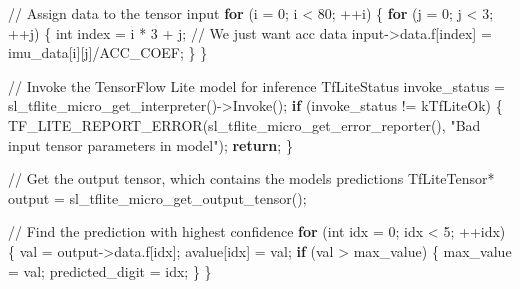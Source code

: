 \documentclass[
  9pt,
  letterpaper,
  abstract,
  titlepage]{scrbook}
\newenvironment{Shaded}{\begin{snugshade}}{\end{snugshade}}
\newcommand{\CommentTok}[1]{\textcolor[rgb]{0.37,0.37,0.37}{#1}}
\newcommand{\ControlFlowTok}[1]{\textcolor[rgb]{0.00,0.23,0.31}{\textbf{#1}}}
\newcommand{\DataTypeTok}[1]{\textcolor[rgb]{0.68,0.00,0.00}{#1}}
\newcommand{\DecValTok}[1]{\textcolor[rgb]{0.68,0.00,0.00}{#1}}
\newcommand{\NormalTok}[1]{\textcolor[rgb]{0.00,0.23,0.31}{#1}}
\newcommand{\OperatorTok}[1]{\textcolor[rgb]{0.37,0.37,0.37}{#1}}
\newcommand{\StringTok}[1]{\textcolor[rgb]{0.13,0.47,0.30}{#1}}
\begin{document}
\begin{Shaded}
\begin{Highlighting}[]
  \CommentTok{// Assign data to the tensor input}
  \ControlFlowTok{for} \OperatorTok{(}\NormalTok{i }\OperatorTok{=} \DecValTok{0}\OperatorTok{;}\NormalTok{ i }\OperatorTok{\textless{}} \DecValTok{80}\OperatorTok{;} \OperatorTok{++}\NormalTok{i}\OperatorTok{)} \OperatorTok{\{}
      \ControlFlowTok{for} \OperatorTok{(}\NormalTok{j }\OperatorTok{=} \DecValTok{0}\OperatorTok{;}\NormalTok{ j }\OperatorTok{\textless{}} \DecValTok{3}\OperatorTok{;} \OperatorTok{++}\NormalTok{j}\OperatorTok{)} \OperatorTok{\{}
          \DataTypeTok{int}\NormalTok{ index }\OperatorTok{=}\NormalTok{ i }\OperatorTok{*} \DecValTok{3} \OperatorTok{+}\NormalTok{ j}\OperatorTok{;}  \CommentTok{// We just want acc data}
\NormalTok{          input}\OperatorTok{{-}\textgreater{}}\NormalTok{data}\OperatorTok{.}\NormalTok{f}\OperatorTok{[}\NormalTok{index}\OperatorTok{]} \OperatorTok{=}\NormalTok{ imu\_data}\OperatorTok{[}\NormalTok{i}\OperatorTok{][}\NormalTok{j}\OperatorTok{]/}\NormalTok{ACC\_COEF}\OperatorTok{;}
       \OperatorTok{\}}
   \OperatorTok{\}}

  \CommentTok{// Invoke the TensorFlow Lite model for inference}
\NormalTok{  TfLiteStatus invoke\_status }\OperatorTok{=}\NormalTok{ sl\_tflite\_micro\_get\_interpreter}\OperatorTok{(){-}\textgreater{}}\NormalTok{Invoke}\OperatorTok{();}
  \ControlFlowTok{if} \OperatorTok{(}\NormalTok{invoke\_status }\OperatorTok{!=}\NormalTok{ kTfLiteOk}\OperatorTok{)} \OperatorTok{\{}
\NormalTok{      TF\_LITE\_REPORT\_ERROR}\OperatorTok{(}\NormalTok{sl\_tflite\_micro\_get\_error\_reporter}\OperatorTok{(),}
                              \StringTok{"Bad input tensor parameters in model"}\OperatorTok{);}
      \ControlFlowTok{return}\OperatorTok{;}
  \OperatorTok{\}}

  \CommentTok{// Get the output tensor, which contains the model\textquotesingle{}s predictions}
\NormalTok{  TfLiteTensor}\OperatorTok{*}\NormalTok{ output }\OperatorTok{=}\NormalTok{ sl\_tflite\_micro\_get\_output\_tensor}\OperatorTok{();}

  \CommentTok{// Find the prediction with highest confidence}
  \ControlFlowTok{for} \OperatorTok{(}\DataTypeTok{int}\NormalTok{ idx }\OperatorTok{=} \DecValTok{0}\OperatorTok{;}\NormalTok{ idx }\OperatorTok{\textless{}} \DecValTok{5}\OperatorTok{;} \OperatorTok{++}\NormalTok{idx}\OperatorTok{)} \OperatorTok{\{}
\NormalTok{      val }\OperatorTok{=}\NormalTok{ output}\OperatorTok{{-}\textgreater{}}\NormalTok{data}\OperatorTok{.}\NormalTok{f}\OperatorTok{[}\NormalTok{idx}\OperatorTok{];}
\NormalTok{      avalue}\OperatorTok{[}\NormalTok{idx}\OperatorTok{]} \OperatorTok{=}\NormalTok{ val}\OperatorTok{;}
      \ControlFlowTok{if} \OperatorTok{(}\NormalTok{val }\OperatorTok{\textgreater{}}\NormalTok{ max\_value}\OperatorTok{)} \OperatorTok{\{}
\NormalTok{          max\_value }\OperatorTok{=}\NormalTok{ val}\OperatorTok{;}
\NormalTok{          predicted\_digit }\OperatorTok{=}\NormalTok{ idx}\OperatorTok{;}
      \OperatorTok{\}}
  \OperatorTok{\}}


\end{Highlighting}
\end{Shaded}
\end{document}
